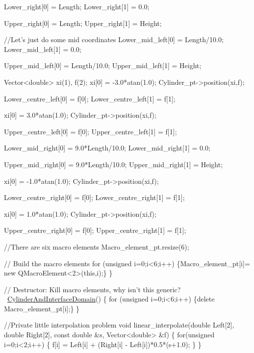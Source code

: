 \begin{DoxyCodeInclude}
   Lower\_right[0] = Length;
   Lower\_right[1] = 0.0;
   
   Upper\_right[0] = Length;
   Upper\_right[1] = Height;


   \textcolor{comment}{//Let's just do some mid coordinates}
   Lower\_mid\_left[0] = Length/10.0;
   Lower\_mid\_left[1] = 0.0;

   Upper\_mid\_left[0] = Length/10.0;
   Upper\_mid\_left[1] = Height;

   Vector<double> xi(1), f(2);
   xi[0] = -3.0*atan(1.0);
   Cylinder\_pt->position(xi,f);

   Lower\_centre\_left[0] = f[0];
   Lower\_centre\_left[1] = f[1];
   
   xi[0] = 3.0*atan(1.0);
   Cylinder\_pt->position(xi,f);

   Upper\_centre\_left[0] = f[0];
   Upper\_centre\_left[1] = f[1];


   Lower\_mid\_right[0] = 9.0*Length/10.0;
   Lower\_mid\_right[1] = 0.0;

   Upper\_mid\_right[0] = 9.0*Length/10.0;
   Upper\_mid\_right[1] = Height;


   xi[0] = -1.0*atan(1.0);
   Cylinder\_pt->position(xi,f);

   Lower\_centre\_right[0] = f[0];
   Lower\_centre\_right[1] = f[1];
   
   xi[0] = 1.0*atan(1.0);
   Cylinder\_pt->position(xi,f);

   Upper\_centre\_right[0] = f[0];
   Upper\_centre\_right[1] = f[1];
   
   \textcolor{comment}{//There are six macro elements}
   Macro\_element\_pt.resize(6); 

   \textcolor{comment}{// Build the macro elements}
   \textcolor{keywordflow}{for} (\textcolor{keywordtype}{unsigned} i=0;i<6;i++)
    \{Macro\_element\_pt[i]= \textcolor{keyword}{new} QMacroElement<2>(\textcolor{keyword}{this},i);\}
  \}

 \textcolor{comment}{// Destructor: Kill macro elements, why isn't this generic?}
 ~\hyperlink{classCylinderAndInterfaceDomain}{CylinderAndInterfaceDomain}()
 \{
  \textcolor{keywordflow}{for} (\textcolor{keywordtype}{unsigned} i=0;i<6;i++) \{\textcolor{keyword}{delete} Macro\_element\_pt[i];\}
 \}


 \textcolor{comment}{//Private little interpolation problem}
 \textcolor{keywordtype}{void} linear\_interpolate(\textcolor{keywordtype}{double} Left[2], \textcolor{keywordtype}{double} Right[2],
                         \textcolor{keyword}{const} \textcolor{keywordtype}{double} &s, Vector<double> &f)
  \{
   \textcolor{keywordflow}{for}(\textcolor{keywordtype}{unsigned} i=0;i<2;i++)
    \{
     f[i] = Left[i] + (Right[i] - Left[i])*0.5*(s+1.0);
    \}
  \}


\end{DoxyCodeInclude}
